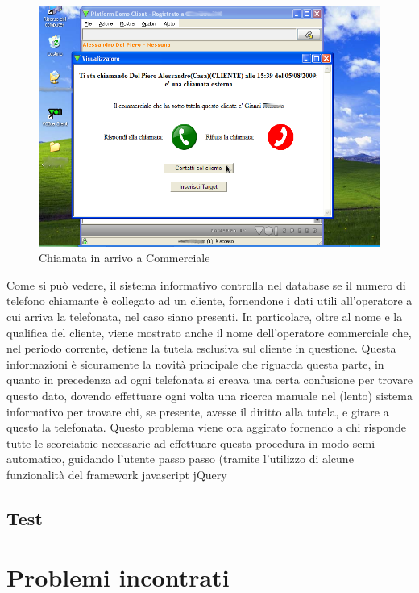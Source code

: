 \begin{figure}[!ht]
\centering
  \includegraphics[scale=0.8]{./images/chiamata_commerciale.png}
\caption{Chiamata in arrivo a Commerciale}
\end{figure}

Come si pu\`o vedere, il sistema informativo controlla nel database se il numero di telefono chiamante \`e collegato ad un cliente, 
fornendone i dati utili all'operatore a cui arriva la telefonata, nel caso siano presenti. In particolare, oltre al nome e la qualifica 
del cliente, viene mostrato anche il nome dell'operatore commerciale che, nel periodo corrente, detiene la tutela esclusiva sul cliente in 
questione. Questa informazioni \`e sicuramente la novit\`a principale che riguarda questa parte, in quanto in precedenza ad ogni 
telefonata si creava una certa confusione per trovare questo dato, dovendo effettuare ogni volta una ricerca manuale nel (lento) sistema informativo 
per trovare chi, se presente, avesse il diritto alla tutela, e girare a questo la telefonata.
Questo problema viene ora aggirato fornendo a chi risponde tutte le scorciatoie necessarie ad effettuare questa procedura in modo 
semi-automatico, guidando l'utente passo passo (tramite l'utilizzo di alcune funzionalit\`a del framework javascript jQuery
\section{Test}

\chapter{Problemi incontrati}

